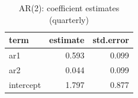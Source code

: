 \begin{table}

\caption{\label{tab:ar2-coef}AR(2): coefficient estimates (quarterly)}
\centering
\begin{tabular}[t]{lrr}
\toprule
term & estimate & std.error\\
\midrule
ar1 & 0.593 & 0.099\\
ar2 & 0.044 & 0.099\\
intercept & 1.797 & 0.877\\
\bottomrule
\end{tabular}
\end{table}
